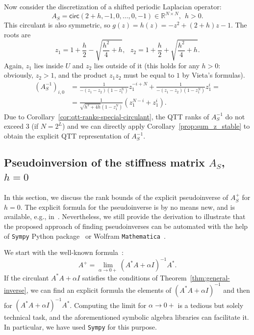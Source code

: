 \documentclass[a4paper]{article}
\newcommand{\LL}{L}
\newcommand{\lap}{A_S}
\newcommand{\base}{2}
\begin{document}
    Now consider the discretization of a shifted periodic Laplacian operator:
    \[
    \lap = \mathsf{circ}(2+h,-1,0,\dots,0,-1) \in \mathbb{R}^{N \times N},~~h > 0.
    \]
    This circulant is also symmetric, so $g(z) = h(z) = -z^2 + (2+h)z - 1$.
    The roots are 
    \[
    z_{1} = 1 + \frac{h}{2} - \sqrt{\frac{h^2}{4}+h},
    ~~~
    z_{2} = 1 + \frac{h}{2} + \sqrt{\frac{h^2}{4}+h}.
    \]
    Again, $z_1$ lies inside $U$ and $z_2$ lies outside of it (this holds for any $h > 0$: obviously, $z_2 > 1$, and the product $z_1z_2$ must be equal to $1$ by Vieta's formulas).
    \begin{align*}
    (\lap^{-1})_{i,0} 
    &=
    \frac{1}{-(z_1-z_2)(1-z_1^N)}z_1^{-i+N}
    +
    \frac{1}{-(z_1-z_2)(1-z_1^N)}z_1^{i}
    = \\ &=
    \frac{1}{\sqrt{h^2 + 4h}(1-z_1^N)}
    \left(
    z_1^{N-i} + z_1^{i}
    \right).
    \end{align*}
    Due to Corollary~\ref{cor:qtt-ranks-special-circulant}, the QTT ranks of $\lap^{-1}$ do not exceed $3$ (if $N = \base^\LL$) and we can directly apply Corollary~\ref{prop:sum_z_stable} to obtain the explicit QTT representation of $\lap^{-1}$.


\subsection{Pseudoinversion of the stiffness matrix $\lap$, $h=0$}\label{sec:pseudo}

	In this section, we discuss the rank bounds of the explicit pseudoinverse of $\lap^+$ for $h=0$.
	The explicit formula for the pseudoinverse is by no means new, and is available, e.g., in~\cite{plonka2016pseudo}.
	Nevertheless, we still provide the derivation to illustrate that the proposed approach of finding pseudoinverses can be automated with the help of \texttt{Sympy} Python package~\cite{sympy} or Wolfram \texttt{Mathematica}~\cite{Mathematica}.
	
	We start with the well-known formula~\cite{golub2013matrix}:
	\begin{equation}\label{eq:pseudoinverse-lim}
	    A^+ = \lim_{\alpha \to 0+} (A^*A + \alpha I)^{-1}A^*.
	\end{equation}
	If the circulant $A^*A + \alpha I$ satisfies the conditions of Theorem~\ref{thm:general-inverse}, we can find an explicit formula the elements of $(A^*A + \alpha I)^{-1}$ and then for $(A^*A + \alpha I)^{-1}A^*$.
	Computing the limit for $\alpha \to 0+$ is a tedious but solely technical task, and the aforementioned symbolic algebra libraries can facilitate it. %
	In particular, we have used \texttt{Sympy} for this purpose.
	
\end{document}
